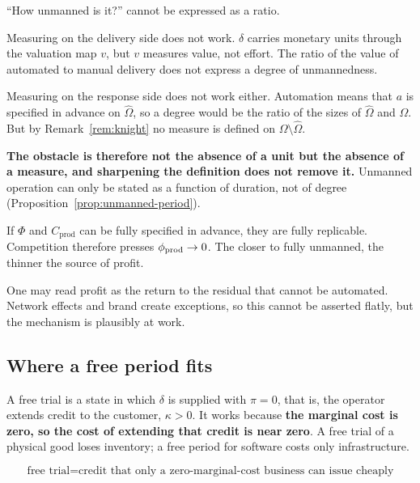 \begin{remark}
\label{rem:automation-rate-illposed}
``How unmanned is it?'' cannot be expressed as a ratio.

Measuring on the delivery side does not work. $\delta$ carries monetary units through the
valuation map $v$, but $v$ measures value, not effort. The ratio of the value of automated to
manual delivery does not express a degree of unmannedness.

Measuring on the response side does not work either. Automation means that $a$ is specified
in advance on $\hat\Omega$, so a degree would be the ratio of the sizes of $\hat\Omega$ and
$\Omega$. But by Remark~\ref{rem:knight} no measure is defined on
$\Omega\setminus\hat\Omega$.

\textbf{The obstacle is therefore not the absence of a unit but the absence of a measure, and
sharpening the definition does not remove it.} Unmanned operation can only be stated as a
function of duration, not of degree (Proposition~\ref{prop:unmanned-period}).
\end{remark}

\begin{remark}
If $\Phi$ and $C_{\mathrm{prod}}$ can be fully specified in advance, they are fully
replicable. Competition therefore presses $\phi_{\rm prod}\to 0$. The closer to fully
unmanned, the thinner the source of profit.

One may read profit as the return to the residual that cannot be automated. Network effects
and brand create exceptions, so this cannot be asserted flatly, but the mechanism is
plausibly at work.
\end{remark}

\subsection{Where a free period fits}

A free trial is a state in which $\delta$ is supplied with $\pi=0$, that is, the operator
extends credit to the customer, $\kappa>0$. It works because
\textbf{the marginal cost is zero, so the cost of extending that credit is near zero}. A free
trial of a physical good loses inventory; a free period for software costs only
infrastructure.

\begin{equation}
\text{free trial} = \text{credit that only a zero-marginal-cost business can issue cheaply}
\end{equation}

